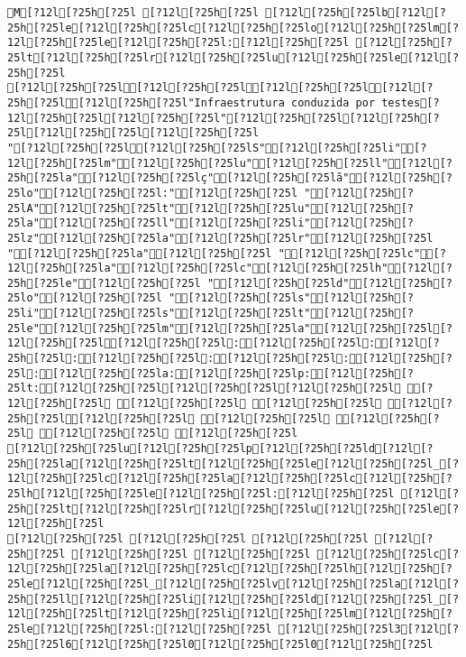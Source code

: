 \documentclass{scrartcl}
\begin{document}
\begin{Verbatim}
M[?12l[?25h[?25l [?12l[?25h[?25l [?12l[?25h[?25lb[?12l[?25h[?25le[?12l[?25h[?25lc[?12l[?25h[?25lo[?12l[?25h[?25lm[?12l[?25h[?25le[?12l[?25h[?25l:[?12l[?25h[?25l [?12l[?25h[?25lt[?12l[?25h[?25lr[?12l[?25h[?25lu[?12l[?25h[?25le[?12l[?25h[?25l
[?12l[?25h[?25l[?12l[?25h[?25l[?12l[?25h[?25l[?12l[?25h[?25l[?12l[?25h[?25l"Infraestrutura conduzida por testes[?12l[?25h[?25l[?12l[?25h[?25l"[?12l[?25h[?25l[?12l[?25h[?25l[?12l[?25h[?25l[?12l[?25h[?25l
"[?12l[?25h[?25l[?12l[?25h[?25lS"[?12l[?25h[?25li"[?12l[?25h[?25lm"[?12l[?25h[?25lu"[?12l[?25h[?25ll"[?12l[?25h[?25la"[?12l[?25h[?25lç"[?12l[?25h[?25lã"[?12l[?25h[?25lo"[?12l[?25h[?25l:"[?12l[?25h[?25l "[?12l[?25h[?25lA"[?12l[?25h[?25lt"[?12l[?25h[?25lu"[?12l[?25h[?25la"[?12l[?25h[?25ll"[?12l[?25h[?25li"[?12l[?25h[?25lz"[?12l[?25h[?25la"[?12l[?25h[?25lr"[?12l[?25h[?25l "[?12l[?25h[?25la"[?12l[?25h[?25l "[?12l[?25h[?25lc"[?12l[?25h[?25la"[?12l[?25h[?25lc"[?12l[?25h[?25lh"[?12l[?25h[?25le"[?12l[?25h[?25l "[?12l[?25h[?25ld"[?12l[?25h[?25lo"[?12l[?25h[?25l "[?12l[?25h[?25ls"[?12l[?25h[?25li"[?12l[?25h[?25ls"[?12l[?25h[?25lt"[?12l[?25h[?25le"[?12l[?25h[?25lm"[?12l[?25h[?25la"[?12l[?25h[?25l[?12l[?25h[?25l[?12l[?25h[?25l:[?12l[?25h[?25l:[?12l[?25h[?25l:[?12l[?25h[?25l:[?12l[?25h[?25l:[?12l[?25h[?25l:[?12l[?25h[?25la:[?12l[?25h[?25lp:[?12l[?25h[?25lt:[?12l[?25h[?25l[?12l[?25h[?25l[?12l[?25h[?25l [?12l[?25h[?25l [?12l[?25h[?25l [?12l[?25h[?25l [?12l[?25h[?25l[?12l[?25h[?25l [?12l[?25h[?25l [?12l[?25h[?25l [?12l[?25h[?25l [?12l[?25h[?25l
[?12l[?25h[?25lu[?12l[?25h[?25lp[?12l[?25h[?25ld[?12l[?25h[?25la[?12l[?25h[?25lt[?12l[?25h[?25le[?12l[?25h[?25l_[?12l[?25h[?25lc[?12l[?25h[?25la[?12l[?25h[?25lc[?12l[?25h[?25lh[?12l[?25h[?25le[?12l[?25h[?25l:[?12l[?25h[?25l [?12l[?25h[?25lt[?12l[?25h[?25lr[?12l[?25h[?25lu[?12l[?25h[?25le[?12l[?25h[?25l
[?12l[?25h[?25l [?12l[?25h[?25l [?12l[?25h[?25l [?12l[?25h[?25l [?12l[?25h[?25l [?12l[?25h[?25l [?12l[?25h[?25lc[?12l[?25h[?25la[?12l[?25h[?25lc[?12l[?25h[?25lh[?12l[?25h[?25le[?12l[?25h[?25l_[?12l[?25h[?25lv[?12l[?25h[?25la[?12l[?25h[?25ll[?12l[?25h[?25li[?12l[?25h[?25ld[?12l[?25h[?25l_[?12l[?25h[?25lt[?12l[?25h[?25li[?12l[?25h[?25lm[?12l[?25h[?25le[?12l[?25h[?25l:[?12l[?25h[?25l [?12l[?25h[?25l3[?12l[?25h[?25l6[?12l[?25h[?25l0[?12l[?25h[?25l0[?12l[?25h[?25l

\end{Verbatim}
\end{document}
